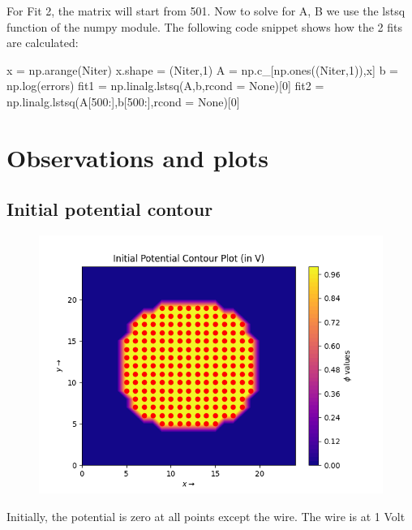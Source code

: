 \documentclass[12pt, a4paper]{article}
\begin{document}
For Fit 2, the matrix will start from 501. Now to solve for A, B we use the lstsq function of the numpy module. The following code snippet shows how the 2 fits are calculated:
\vspace{0.8cm}
\begin{py_code}
    x = np.arange(Niter)
    x.shape = (Niter,1)
    A = np.c_[np.ones((Niter,1)),x]
    b = np.log(errors)
    fit1 = np.linalg.lstsq(A,b,rcond = None)[0]
    fit2 = np.linalg.lstsq(A[500:],b[500:],rcond = None)[0]
\end{py_code}

\section{Observations and plots}
\subsection{Initial potential contour}
\vspace*{-0.5cm}
\begin{figure}[H]
    \centering
    \includegraphics[scale = 0.75]{Figure_1.png}
    \label{fig:sample}
\end{figure}
\vspace*{-0.5cm}
\begin{center}
    Initially, the potential is zero at all points except the wire. The wire is at 1 Volt
\end{center}
\end{document}
